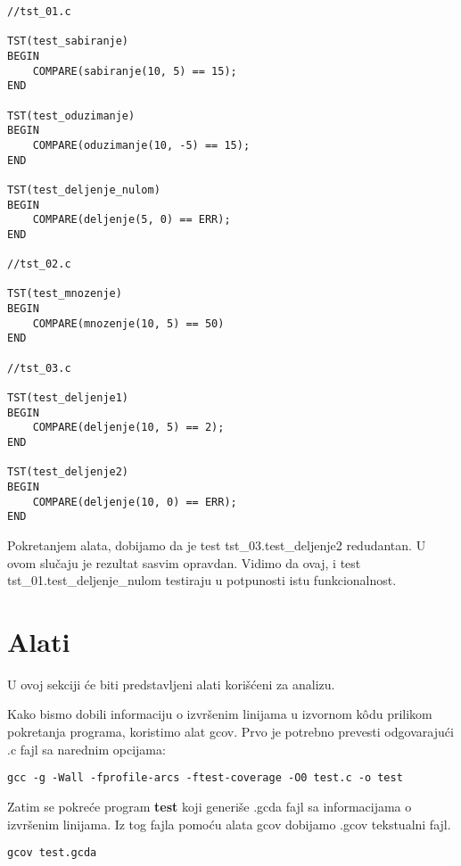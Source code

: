 \documentclass[a4paper]{article}
\begin{document}
\begin{lstlisting}
//tst_01.c

TST(test_sabiranje)
BEGIN
	COMPARE(sabiranje(10, 5) == 15);
END

TST(test_oduzimanje)
BEGIN
	COMPARE(oduzimanje(10, -5) == 15);
END

TST(test_deljenje_nulom)
BEGIN
	COMPARE(deljenje(5, 0) == ERR);
END

//tst_02.c

TST(test_mnozenje)
BEGIN
	COMPARE(mnozenje(10, 5) == 50)
END

//tst_03.c

TST(test_deljenje1)
BEGIN
	COMPARE(deljenje(10, 5) == 2);
END

TST(test_deljenje2)
BEGIN
	COMPARE(deljenje(10, 0) == ERR);
END
\end{lstlisting}

Pokretanjem alata, dobijamo da je test tst\_03.test\_deljenje2 redudantan. U ovom slučaju je rezultat sasvim opravdan. Vidimo da ovaj, i test tst\_01.test\_deljenje\_nulom testiraju u potpunosti istu funkcionalnost.

\section{Alati}
\label{sec:tools}

U ovoj sekciji će biti predstavljeni alati korišćeni za analizu.

Kako bismo dobili informaciju o izvršenim linijama u izvornom kôdu prilikom pokretanja programa, koristimo alat gcov. Prvo je potrebno prevesti odgovarajući .c fajl sa narednim opcijama:

\begin{verbatim}
gcc -g -Wall -fprofile-arcs -ftest-coverage -O0 test.c -o test
\end{verbatim}

Zatim se pokreće program \textbf{test} koji generiše .gcda fajl sa informacijama o izvršenim linijama. Iz tog fajla pomoću alata gcov dobijamo .gcov tekstualni fajl.

\begin{verbatim}
gcov test.gcda
\end{verbatim}
\end{document}

